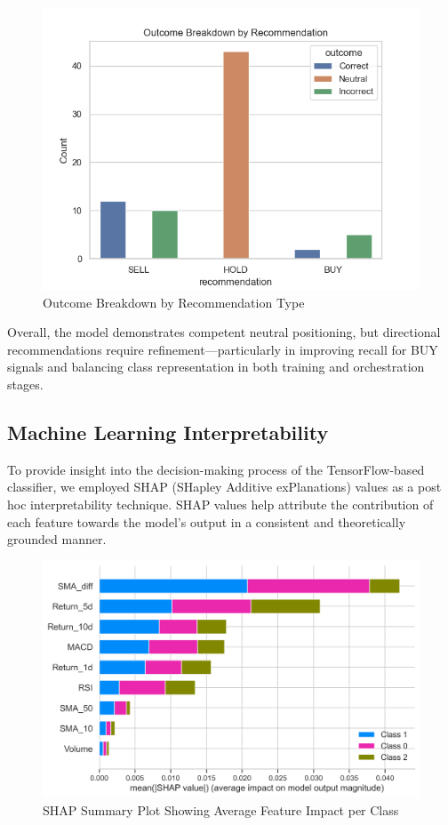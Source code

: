 \begin{figure}[h]
  \centering
  \includegraphics[width=0.6\linewidth]{assets/outcome_breakdown_by_recommendation.png}
  \caption{Outcome Breakdown by Recommendation Type}
  \label{fig:outcome_breakdown}
\end{figure}

Overall, the model demonstrates competent neutral positioning, but directional recommendations require refinement—particularly in improving recall for BUY signals and balancing class representation in both training and orchestration stages.

\subsection{Machine Learning Interpretability}

To provide insight into the decision-making process of the TensorFlow-based classifier, we employed SHAP (SHapley Additive exPlanations) values as a post hoc interpretability technique. SHAP values help attribute the contribution of each feature towards the model’s output in a consistent and theoretically grounded manner.

\begin{figure}[h]
  \centering
  \includegraphics[width=0.8\linewidth]{assets/shap_summary_bar.png}
  \caption{SHAP Summary Plot Showing Average Feature Impact per Class}
  \label{fig:shap_summary}
\end{figure}

